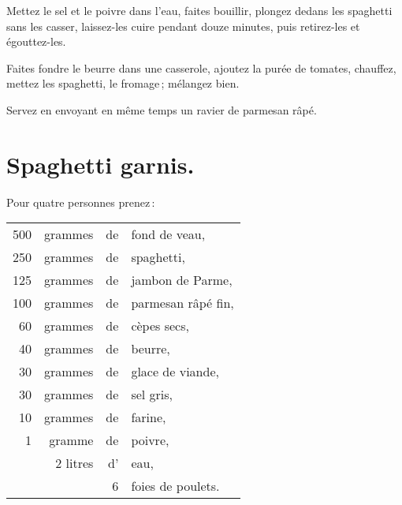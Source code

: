 Mettez le sel et le poivre dans l'eau, faites bouillir, plongez dedans les
spaghetti sans les casser, laissez-les cuire pendant douze minutes, puis
retirez-les et égouttez-les.

Faites fondre le beurre dans une casserole, ajoutez la purée de tomates,
chauffez, mettez les spaghetti, le fromage ; mélangez bien.

Servez en envoyant en même temps un ravier de parmesan râpé.

\section*{\centering Spaghetti garnis.}
{}

Pour quatre personnes prenez :

\footnotesize
\begin{longtable}{rrrp{16em}}
    500 & grammes  & de & fond de veau,                                                                   \\
    250 & grammes  & de & spaghetti,                                                                      \\
    125 & grammes  & de & jambon de Parme,                                                                \\
    100 & grammes  & de & parmesan râpé fin,                                                              \\
     60 & grammes  & de & cèpes secs,                                                                     \\
     40 & grammes  & de & beurre,                                                                         \\
     30 & grammes  & de & glace de viande,                                                                \\
     30 & grammes  & de & sel gris,                                                                       \\
     10 & grammes  & de & farine,                                                                         \\
      1 & gramme   & de & poivre,                                                                         \\
        & 2 litres & d' & eau,                                                                            \\
        &          &  6 & foies de poulets.                                                               \\
\end{longtable}
\normalsize


